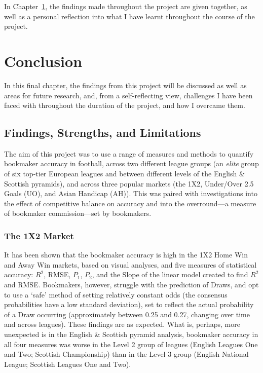 \documentclass[a4paper,10pt]{report}
\begin{document}
In Chapter~\ref{ch:conc}, the findings made throughout the project are given together, as well as a personal reflection into what I have learnt throughout the course of the project.

\chapter{Conclusion}\label{ch:conc}
In this final chapter, the findings from this project will be discussed as well as areas for future research, and, from a self-reflecting view, challenges I have been faced with throughout the duration of the project, and how I overcame them.  

\section{Findings, Strengths, and Limitations}\label{sec:findings}
The aim of this project was to use a range of measures and methods to quantify bookmaker accuracy in football, across two different league groups (an \textit{elite} group of six top-tier European leagues and between different levels of the English \& Scottish pyramids), and across three popular markets (the 1X2, Under/Over 2.5 Goals (UO), and Asian Handicap (AH)). This was paired with investigations into the effect of competitive balance on accuracy and into the overround---a measure of bookmaker commission---set by bookmakers.

\subsection*{The 1X2 Market}
It has been shown that the bookmaker accuracy is high in the 1X2 Home Win and Away Win markets, based on visual analyses, and five measures of statistical accuracy: $R^2$, RMSE, $P_1$, $P_2$, and the Slope of the linear model created to find $R^2$ and RMSE. Bookmakers, however, struggle with the prediction of Draws, and opt to use a ‘safe’ method of setting relatively constant odds (the consensus probabilities have a low standard deviation), set to reflect the actual probability of a Draw occurring (approximately between 0.25 and 0.27, changing over time and across leagues). These findings are as expected. What is, perhaps, more unexpected is in the English \& Scottish pyramid analysis, bookmaker accuracy in all four measures was worse in the Level 2 group of leagues (English Leagues One and Two; Scottish Championship) than in the Level 3 group (English National League; Scottish Leagues One and Two). 
\end{document}
